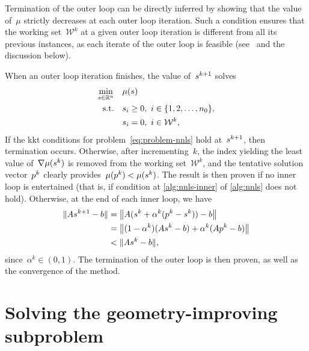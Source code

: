 Termination of the outer loop can be directly inferred by showing that the value of~$\mu$ strictly decreases at each outer loop iteration.
Such a condition ensures that the working set~$\mathcal{W}^k$ at a given outer loop iteration is different from all its previous instances, as each iterate of the outer loop is feasible (see~\cite[Lem.~23.17]{Lawson_Hanson_1987} and the discussion below).

When an outer loop iteration finishes, the value of~$\sstep[k + 1]$ solves
\begin{align*}
    \min_{\sstep \in \R^n}  & \quad \mu(\sstep)\\
    \text{s.t.}             & \quad \sstep_i \ge 0, ~ i \in \set{1, 2, \dots, n_0},\\
                            & \quad \sstep_i = 0, ~ i \in \mathcal{W}^k,
\end{align*}
If the \gls{kkt} conditions for problem~\cref{eq:problem-nnls} hold at~$\sstep[k + 1]$, then termination occurs.
Otherwise, after incrementing~$k$, the index yielding the least value of~$\nabla \mu(\sstep[k])$ is removed from the working set~$\mathcal{W}^k$, and the tentative solution vector~$\pstep[k]$ clearly provides~$\mu(\pstep[k]) < \mu(\sstep[k])$.
The result is then proven if no inner loop is entertained (that is, if condition at \cref{alg:nnls-inner} of \cref{alg:nnls} does not hold).
Otherwise, at the end of each inner loop, we have
\begin{align*}
    \norm{A \sstep[k + 1] - b}  & = \norm[\big]{A (\sstep[k] + \alpha^k (\pstep[k] - \sstep[k])) - b}\\
                                & = \norm[\big]{(1 - \alpha^k) (A \sstep[k] - b) + \alpha^k (A \pstep[k] - b)}\\
                                & < \norm{A \sstep[k] - b},
\end{align*}
since~$\alpha^k \in (0, 1)$.
The termination of the outer loop is then proven, as well as the convergence of the method.


\section{Solving the geometry-improving subproblem}
\label{sec:cobyqa-geometry-improving}

